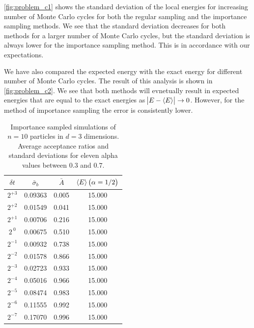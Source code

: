 \documentclass[
    a4paper, aps, twocolumn, floatfix, superscriptaddress,
    nofootinbib]{revtex4-1}
\newcommand{\1}{\mathds{1}}
\begin{document}
            \autoref{fig:problem_c1} shows the standard deviation of the local
            energies for increasing number of Monte Carlo cycles for both the
            regular sampling and the importance sampling methods. We see that
            the standard deviation decreases for both methods for a larger
            number of Monte Carlo cycles, but the standard deviation is always
            lower for the importance sampling method. This is in accordance with
            our expectations.

            We have also compared the expected energy with the exact energy for
            different number of Monte Carlo cycles. The result of this analysis
            is shown in \autoref{fig:problem_c2}. We see that both methods will
            evnetually result in expected energies that are equal to the exact
            energies as $\abs{E - \expval{E}} \to 0$. However, for the method of
            importance sampling the error is consistently lower.

            \begin{table}
                \caption{Importance sampled simulations of $n=10$ particles in
                $d=3$ dimensions. Average acceptance ratios and standard
                deviations for eleven alpha values between $0.3$ and $0.7$.}
                \centering
                    \begin{ruledtabular}
                        \begin{tabular}{cccc}
                            $\delta t$ & $\bar{\sigma}_b$ & $\bar{A}$
                            & $\expval{E}\left(\alpha = 1/2\right)$ \\
                            \hline
                            $2^{+3}$ & 0.09363 & 0.005 & 15.000 \\
                            $2^{+2}$ & 0.01549  & 0.041 & 15.000 \\
                            $2^{+1}$ & 0.00706 & 0.216 & 15.000 \\
                            $2^{\ 0}$ & 0.00675 & 0.510 & 15.000 \\
                            $2^{-1}$ & 0.00932 & 0.738 & 15.000 \\
                            $2^{-2}$ & 0.01578 & 0.866 & 15.000 \\
                            $2^{-3}$ & 0.02723 & 0.933 & 15.000 \\
                            $2^{-4}$ & 0.05016 & 0.966 & 15.000 \\
                            $2^{-5}$ & 0.08474 & 0.983 & 15.000 \\
                            $2^{-6}$ & 0.11555 & 0.992 & 15.000 \\
                            $2^{-7}$ & 0.17070 & 0.996 & 15.000 \\
                        \end{tabular}
                    \end{ruledtabular}
                    \label{tab:imp_time_step}
            \end{table}
\end{document}
